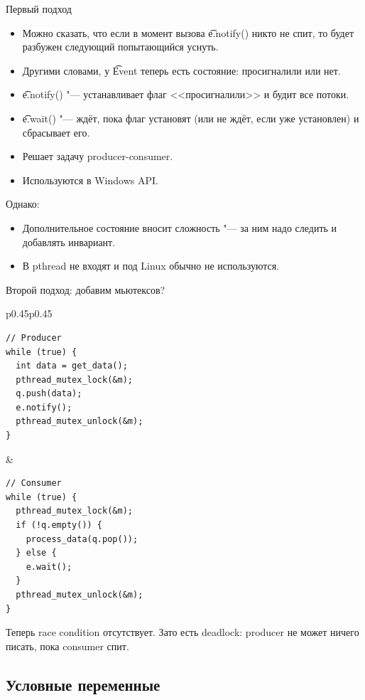 \begin{frame}{Первый подход}
	\begin{itemize}
		\item Можно сказать, что если в момент вызова \t{e.notify()} никто не спит, то будет разбужен следующий попытающийся уснуть.
		\item Другими словами, у \t{Event} теперь есть состояние: просигналили или нет.
		\item \t{e.notify()} "--- устанавливает флаг <<просигналили>> и будит все потоки.
		\item \t{e.wait()} "--- ждёт, пока флаг установят (или не ждёт, если уже установлен) и сбрасывает его.
		\item Решает задачу producer-consumer.
		\item Используются в Windows API.
	\end{itemize}
	Однако:
	\begin{itemize}
		\item Дополнительное состояние вносит сложность "--- за ним надо следить и добавлять инвариант.
		\item В pthread не входят и под Linux обычно не используются.
	\end{itemize}
\end{frame}

\begin{frame}[fragile]{Второй подход: добавим мьютексов?}
	\begin{tabular}{p{0.45\linewidth}p{0.45\linewidth}}
		\centering
\begin{verbatim}
// Producer
while (true) {
  int data = get_data();
  pthread_mutex_lock(&m);
  q.push(data);
  e.notify();
  pthread_mutex_unlock(&m);
}
\end{verbatim}
&
\begin{verbatim}
// Consumer
while (true) {
  pthread_mutex_lock(&m);
  if (!q.empty()) {
    process_data(q.pop());
  } else {
    e.wait();
  }
  pthread_mutex_unlock(&m);
}
\end{verbatim}
	\end{tabular}
	Теперь race condition отсутствует.
	\pause
	Зато есть deadlock: producer не может ничего писать, пока consumer спит.
\end{frame}

\subsection{Условные переменные}

